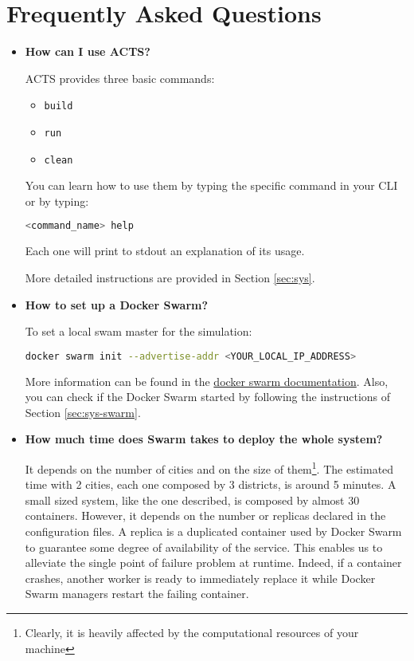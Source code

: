 \section{Frequently Asked Questions}

\begin{itemize}

\item \textbf{How can I use ACTS?}

ACTS provides three basic commands:
\begin{itemize}
	\item \texttt{build}
	\item \texttt{run}
	\item \texttt{clean}
\end{itemize}
You can learn how to use them by typing the specific command in your CLI or
by typing:
\begin{lstlisting}[language=bash]
<command_name> help
\end{lstlisting}
Each one will print to stdout an explanation of its usage.

More detailed instructions are provided in Section \ref{sec:sys}.

\item \textbf{How to set up a Docker Swarm?}

To set a local swam master for the simulation:

\begin{lstlisting}[language=bash]
docker swarm init --advertise-addr <YOUR_LOCAL_IP_ADDRESS>
\end{lstlisting}

More information can be found in the \href{https://docs.docker.com/engine/swarm/swarm-tutorial/create-swarm/}{docker swarm documentation}.
Also, you can check if the Docker Swarm started by following the instructions
of Section \ref{sec:sys-swarm}.

\item \textbf{How much time does Swarm takes to deploy the whole system?}

It depends on the number of cities and on the size of them\footnote{Clearly,
it is heavily affected by the computational resources of your machine}.
The estimated time with 2 cities, each one
composed by 3 districts, is around 5 minutes.
A small sized system, like
the one described, is composed by almost 30 containers.
However, it depends on the number or replicas declared in the configuration
files.
A replica is a duplicated container used by Docker Swarm to guarantee some
degree of availability of the service. This enables us to alleviate the single
point of failure problem at runtime. Indeed, if a container crashes, another
worker is ready to immediately replace it while Docker Swarm managers restart
the failing container.


\end{itemize}
